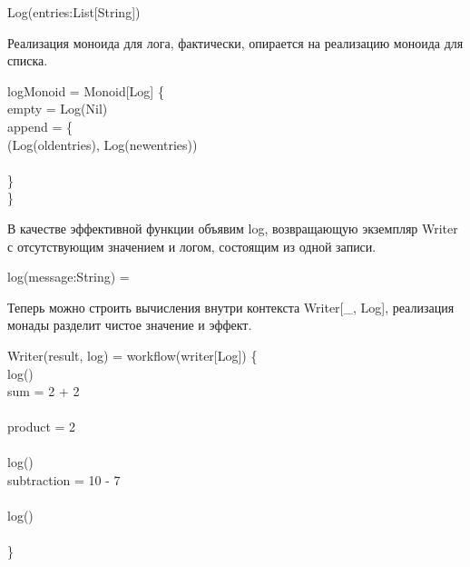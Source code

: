 \begin{haskell}
  Log(entries:List[String])
\end{haskell}

Реализация моноида для лога, фактически, опирается на реализацию моноида для списка.

\begin{haskell}
  logMonoid =  Monoid[Log] \{ \\
\quad{} empty =  Log(Nil) \\
\quad{} append = \{ \\
\quad\quad{} (Log(oldentries), Log(newentries)) \Rightarrow \\
\quad\quad\quad{} \\
\quad\} \\
\}
\end{haskell}

В качестве эффективной функции объявим \<log\>, возвращающую экземпляр \<Writer\> с отсутствующим значением и логом, состоящим из одной записи.

\begin{haskell}
 log(message:String) = \\
\end{haskell}

Теперь можно строить вычисления внутри контекста \<Writer[\_, Log]\>, реализация монады разделит чистое значение и эффект.

\begin{haskell}
 Writer(result, log) = workflow(writer[Log]) \{ \\
\quad\quad log() \\
\quad\quad {} sum = 2 + 2 \\
{}\\
\quad\quad {} product = 2  \\
{}\\
\quad\quad log() \\
\quad\quad {} subtraction = 10 - 7 \\
{}\\
\quad\quad log() \\
\quad{}  \\
\}
\end{haskell}

